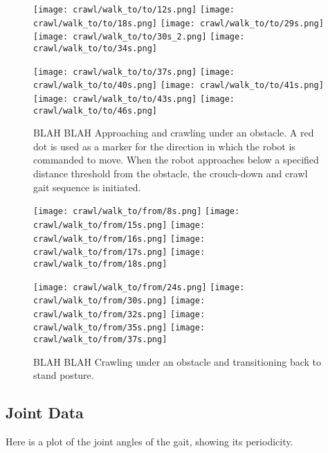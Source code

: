 \begin{figure}
  \centerline{
    \texttt{[image: crawl/walk\_to/to/12s.png]}
    \texttt{[image: crawl/walk\_to/to/18s.png]}
    \texttt{[image: crawl/walk\_to/to/29s.png]}
    \texttt{[image: crawl/walk\_to/to/30s\_2.png]}
    \texttt{[image: crawl/walk\_to/to/34s.png]}
  }
  \vspace*{0.05in}
  \centerline{
    \texttt{[image: crawl/walk\_to/to/37s.png]}
    \texttt{[image: crawl/walk\_to/to/40s.png]}
    \texttt{[image: crawl/walk\_to/to/41s.png]}
    \texttt{[image: crawl/walk\_to/to/43s.png]}
    \texttt{[image: crawl/walk\_to/to/46s.png]}
  }
  \caption{BLAH BLAH Approaching and crawling under an obstacle.
           A red dot is used as a marker for the direction in which the robot is commanded to move.
           When the robot approaches below a specified distance threshold from the obstacle,
           the crouch-down and crawl gait sequence is initiated.}
  \label{fig:nao_table_exp2_crawl1}
\end{figure}

\begin{figure}
  \centerline{
    \texttt{[image: crawl/walk\_to/from/8s.png]}
    \texttt{[image: crawl/walk\_to/from/15s.png]}
    \texttt{[image: crawl/walk\_to/from/16s.png]}
    \texttt{[image: crawl/walk\_to/from/17s.png]}
    \texttt{[image: crawl/walk\_to/from/18s.png]}
  }
  \vspace*{0.05in}
  \centerline{
    \texttt{[image: crawl/walk\_to/from/24s.png]}
    \texttt{[image: crawl/walk\_to/from/30s.png]}
    \texttt{[image: crawl/walk\_to/from/32s.png]}
    \texttt{[image: crawl/walk\_to/from/35s.png]}
    \texttt{[image: crawl/walk\_to/from/37s.png]}
  }
  \caption{BLAH BLAH Crawling under an obstacle and transitioning back to stand posture.}
  \label{fig:nao_table_exp2_crawl2}
\end{figure}

\subsection{Joint Data}
Here is a plot of the joint angles of the gait, showing its periodicity.


